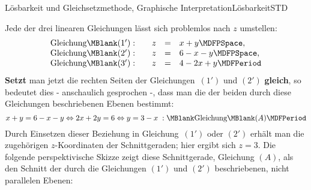 \begin{MXContent}{Lösbarkeit und Gleichsetzmethode, Graphische Interpretation}{Lösbarkeit}{STD}
\begin{MExample}
Jede der drei linearen Gleichungen lässt sich problemlos nach $z$ umstellen:
$$\begin{array}{lcrcl} \mbox{Gleichung}\MBlank (1'): & & z & = & x + y \MDFPSpace,\\
\mbox{Gleichung}\MBlank (2'): & & z & = & 6 - x - y \MDFPSpace,\\
\mbox{Gleichung}\MBlank (3'): & & z & = & 4 - 2 x + y \MDFPeriod \end{array}$$
\textbf{Setzt} man jetzt die rechten Seiten der Gleichungen~$(1')$ und $(2')$ \textbf{gleich}, so bedeutet dies -
anschaulich gesprochen -, dass man die  der beiden durch diese Gleichungen
beschriebenen Ebenen bestimmt:
$$x + y = 6 - x - y \Leftrightarrow 2 x + 2 y = 6 \Leftrightarrow y = 3 - x \; : \MBlank\mbox{Gleichung}\MBlank (A) \MDFPeriod $$
Durch Einsetzen dieser Beziehung in Gleichung~$(1')$ oder $(2')$ erhält man
die zugehörigen $z$-Koordinaten der Schnittgeraden; hier ergibt sich $z=3$.
Die folgende perspektivische Skizze zeigt diese Schnittgerade, Gleichung $(A)$, 
als den Schnitt der durch die Gleichungen $(1')$ und $(2')$ beschriebenen,
nicht parallelen Ebenen:
\begin{center}
\end{center}
\end{MExample}
\end{MXContent}
